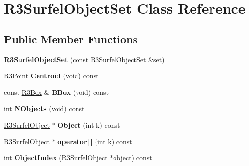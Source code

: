 \hypertarget{class_r3_surfel_object_set}{}\section{R3\+Surfel\+Object\+Set Class Reference}
\label{class_r3_surfel_object_set}
\subsection*{Public Member Functions}
\begin{DoxyCompactItemize}
\item 
{\bfseries R3\+Surfel\+Object\+Set} (const \hyperlink{class_r3_surfel_object_set}{R3\+Surfel\+Object\+Set} \&set)\hypertarget{class_r3_surfel_object_set_aeeaccd7a4f6744bd3175cc7b6ef7d831}{}\label{class_r3_surfel_object_set_aeeaccd7a4f6744bd3175cc7b6ef7d831}

\item 
\hyperlink{class_r3_point}{R3\+Point} {\bfseries Centroid} (void) const \hypertarget{class_r3_surfel_object_set_a87b719bfc51d79caf641b2b210176506}{}\label{class_r3_surfel_object_set_a87b719bfc51d79caf641b2b210176506}

\item 
const \hyperlink{class_r3_box}{R3\+Box} \& {\bfseries B\+Box} (void) const \hypertarget{class_r3_surfel_object_set_aa081af0ba582d70892d2ff9a6b01f480}{}\label{class_r3_surfel_object_set_aa081af0ba582d70892d2ff9a6b01f480}

\item 
int {\bfseries N\+Objects} (void) const \hypertarget{class_r3_surfel_object_set_a5e2f023f024ad330b7256e97ab3df7af}{}\label{class_r3_surfel_object_set_a5e2f023f024ad330b7256e97ab3df7af}

\item 
\hyperlink{class_r3_surfel_object}{R3\+Surfel\+Object} $\ast$ {\bfseries Object} (int k) const \hypertarget{class_r3_surfel_object_set_aa05ac7fa9d9c96499b3ee1aa184a79c7}{}\label{class_r3_surfel_object_set_aa05ac7fa9d9c96499b3ee1aa184a79c7}

\item 
\hyperlink{class_r3_surfel_object}{R3\+Surfel\+Object} $\ast$ {\bfseries operator\mbox{[}$\,$\mbox{]}} (int k) const \hypertarget{class_r3_surfel_object_set_ac276113eea8e38290f1d40d210ae4034}{}\label{class_r3_surfel_object_set_ac276113eea8e38290f1d40d210ae4034}

\item 
int {\bfseries Object\+Index} (\hyperlink{class_r3_surfel_object}{R3\+Surfel\+Object} $\ast$object) const \hypertarget{class_r3_surfel_object_set_a1510c3c24c7141fb69f0d01a0f1fc0ad}{}\label{class_r3_surfel_object_set_a1510c3c24c7141fb69f0d01a0f1fc0ad}


\end{DoxyCompactItemize}
